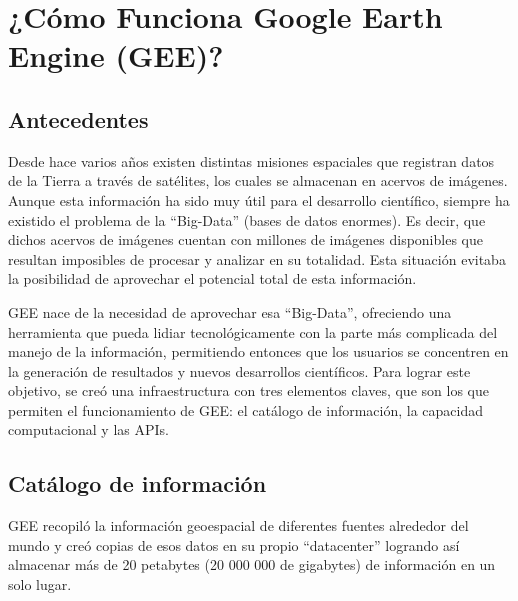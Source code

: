 \documentclass[
  12pt,
  letterpaper,
  twoside]{book}
\begin{document}
\hypertarget{cuxf3mo-funciona-google-earth-engine-gee}{%
\section{¿Cómo Funciona Google Earth Engine (GEE)?}\label{cuxf3mo-funciona-google-earth-engine-gee}}

\hypertarget{antecedentes}{%
\subsection{Antecedentes}\label{antecedentes}}

Desde hace varios años existen distintas misiones espaciales que registran datos de la Tierra a través de satélites, los cuales se almacenan en acervos de imágenes. Aunque esta información ha sido muy útil para el desarrollo científico, siempre ha existido el problema de la ``Big-Data'' (bases de datos enormes). Es decir, que dichos acervos de imágenes cuentan con millones de imágenes disponibles que resultan imposibles de procesar y analizar en su totalidad. Esta situación evitaba la posibilidad de aprovechar el potencial total de esta información.

GEE nace de la necesidad de aprovechar esa ``Big-Data'', ofreciendo una herramienta que pueda lidiar tecnológicamente con la parte más complicada del manejo de la información, permitiendo entonces que los usuarios se concentren en la generación de resultados y nuevos desarrollos científicos. Para lograr este objetivo, se creó una infraestructura con tres elementos claves, que son los que permiten el funcionamiento de GEE: el catálogo de información, la capacidad computacional y las APIs.

\hypertarget{catuxe1logo-de-informaciuxf3n}{%
\subsection{Catálogo de información}\label{catuxe1logo-de-informaciuxf3n}}

GEE recopiló la información geoespacial de diferentes fuentes alrededor del mundo y creó copias de esos datos en su propio ``datacenter'' logrando así almacenar más de 20 petabytes (20 000 000 de gigabytes) de información en un solo lugar.
\end{document}
